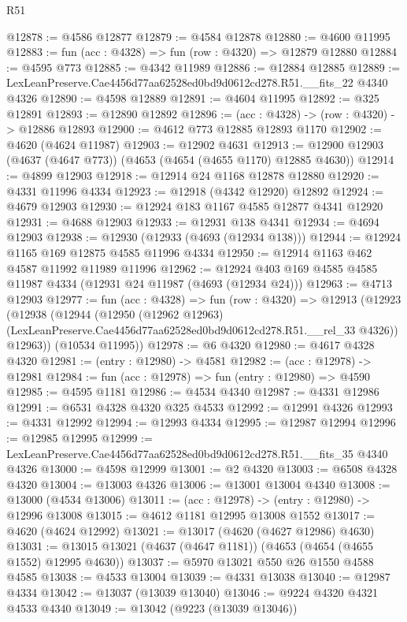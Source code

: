 \begin{lexlean}{R51}
\begin{coremodule}
@12878 := @4586 @12877
@12879 := @4584 @12878
@12880 := @4600 @11995
@12883 := fun (acc : @4328) => fun (row : @4320) => @12879 @12880
@12884 := @4595 @773
@12885 := @4342 @11989
@12886 := @12884 @12885
@12889 := LexLeanPreserve.Cae4456d77aa62528ed0bd9d0612cd278.R51.__fits_22 @4340 @4326
@12890 := @4598 @12889
@12891 := @4604 @11995
@12892 := @325 @12891
@12893 := @12890 @12892
@12896 := (acc : @4328) -> (row : @4320) -> @12886 @12893
@12900 := @4612 @773 @12885 @12893 @1170
@12902 := @4620 (@4624 @11987)
@12903 := @12902 @4631
@12913 := @12900 @12903 (@4637 (@4647 @773)) (@4653 (@4654 (@4655 @1170) @12885 @4630))
@12914 := @4899 @12903
@12918 := @12914 @24 @1168 @12878 @12880
@12920 := @4331 @11996 @4334
@12923 := @12918 (@4342 @12920) @12892
@12924 := @4679 @12903
@12930 := @12924 @183 @1167 @4585 @12877 @4341 @12920
@12931 := @4688 @12903
@12933 := @12931 @138 @4341
@12934 := @4694 @12903
@12938 := @12930 (@12933 (@4693 (@12934 @138)))
@12944 := @12924 @1165 @169 @12875 @4585 @11996 @4334
@12950 := @12914 @1163 @462 @4587 @11992 @11989 @11996
@12962 := @12924 @403 @169 @4585 @4585 @11987 @4334 (@12931 @24 @11987 (@4693 (@12934 @24)))
@12963 := @4713 @12903
@12977 := fun (acc : @4328) =>
  fun (row : @4320) =>
  @12913
    (@12923
      (@12938
        (@12944
          (@12950
            (@12962 @12963)
            (LexLeanPreserve.Cae4456d77aa62528ed0bd9d0612cd278.R51.__rel_33 @4326))
          @12963))
      (@10534 @11995))
@12978 := @6 @4320
@12980 := @4617 @4328 @4320
@12981 := (entry : @12980) -> @4581
@12982 := (acc : @12978) -> @12981
@12984 := fun (acc : @12978) => fun (entry : @12980) => @4590
@12985 := @4595 @1181
@12986 := @4534 @4340
@12987 := @4331 @12986
@12991 := @6531 @4328 @4320 @325 @4533
@12992 := @12991 @4326
@12993 := @4331 @12992
@12994 := @12993 @4334
@12995 := @12987 @12994
@12996 := @12985 @12995
@12999 := LexLeanPreserve.Cae4456d77aa62528ed0bd9d0612cd278.R51.__fits_35 @4340 @4326
@13000 := @4598 @12999
@13001 := @2 @4320
@13003 := @6508 @4328 @4320
@13004 := @13003 @4326
@13006 := @13001 @13004 @4340
@13008 := @13000 (@4534 @13006)
@13011 := (acc : @12978) -> (entry : @12980) -> @12996 @13008
@13015 := @4612 @1181 @12995 @13008 @1552
@13017 := @4620 (@4624 @12992)
@13021 := @13017 (@4620 (@4627 @12986) @4630)
@13031 := @13015 @13021 (@4637 (@4647 @1181)) (@4653 (@4654 (@4655 @1552) @12995 @4630))
@13037 := @5970 @13021 @550 @26 @1550 @4588 @4585
@13038 := @4533 @13004
@13039 := @4331 @13038
@13040 := @12987 @4334
@13042 := @13037 (@13039 @13040)
@13046 := @9224 @4320 @4321 @4533 @4340
@13049 := @13042 (@9223 (@13039 @13046))

\end{coremodule}
\end{lexlean}
